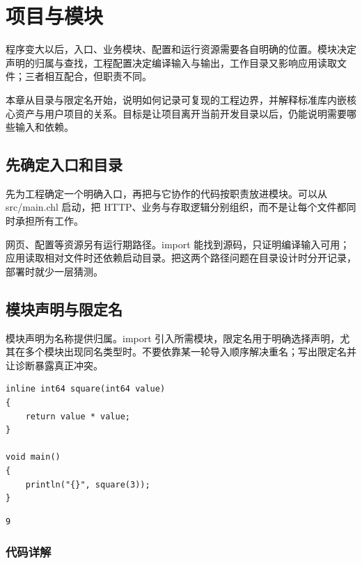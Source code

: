 \chapter{项目与模块}
\label{ch:18}

程序变大以后，入口、业务模块、配置和运行资源需要各自明确的位置。模块决定声明的归属与查找，工程配置决定编译输入与输出，工作目录又影响应用读取文件；三者相互配合，但职责不同。

本章从目录与限定名开始，说明如何记录可复现的工程边界，并解释标准库内嵌核心资产与用户项目的关系。目标是让项目离开当前开发目录以后，仍能说明需要哪些输入和依赖。

\section{先确定入口和目录}

先为工程确定一个明确入口，再把与它协作的代码按职责放进模块。可以从 src/main.chl 启动，把 HTTP、业务与存取逻辑分别组织，而不是让每个文件都同时承担所有工作。

网页、配置等资源另有运行期路径。import 能找到源码，只证明编译输入可用；应用读取相对文件时还依赖启动目录。把这两个路径问题在目录设计时分开记录，部署时就少一层猜测。

\section{模块声明与限定名}

模块声明为名称提供归属。import 引入所需模块，限定名用于明确选择声明，尤其在多个模块出现同名类型时。不要依靠某一轮导入顺序解决重名；写出限定名并让诊断暴露真正冲突。

\par
\medskip
\begin{lstlisting}[style=chali]
inline int64 square(int64 value)
{
    return value * value;
}

void main()
{
    println("{}", square(3));
}
\end{lstlisting}
\par
\medskip

\par
\medskip
\begin{lstlisting}[style=out]
9
\end{lstlisting}
\par
\medskip

\subsection*{代码详解}


